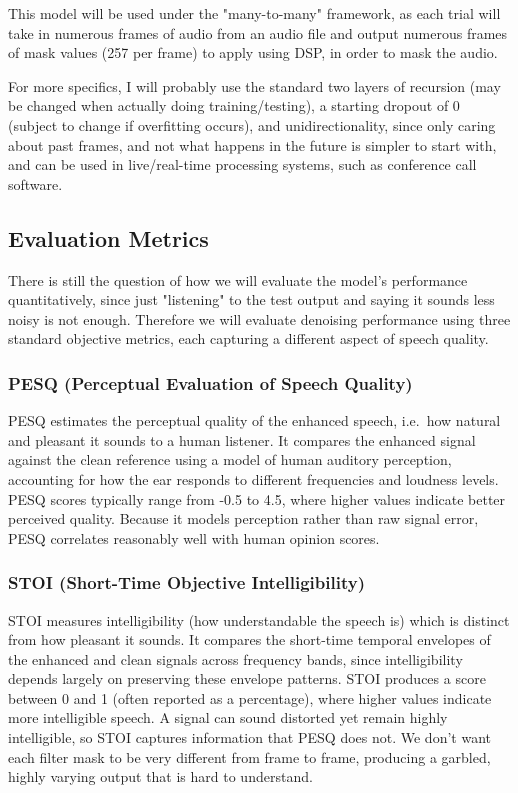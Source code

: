 \documentclass[11pt, letterpaper]{article}
\begin{document}
This model will be used under the "many-to-many" framework, as each trial will take in numerous frames of audio from an audio file and output numerous frames of mask values (257 per frame) to apply using DSP, in order to mask the audio.

For more specifics, I will probably use the standard two layers of recursion (may be changed when actually doing training/testing), a starting dropout of 0 (subject to change if overfitting occurs), and unidirectionality, since only caring about past frames, and not what happens in the future is simpler to start with, and can be used in live/real-time processing systems, such as conference call software. 

\subsection{Evaluation Metrics}

There is still the question of how we will evaluate the model's performance quantitatively, since just "listening" to the test output and saying it sounds less noisy is not enough. Therefore we will evaluate denoising performance using three standard objective metrics, each capturing a different aspect of speech quality.

\subsubsection{PESQ (Perceptual Evaluation of Speech Quality)}
PESQ estimates the perceptual quality of the enhanced speech,
i.e.\ how natural and pleasant it sounds to a human listener. It
compares the enhanced signal against the clean reference using a model
of human auditory perception, accounting for how the ear responds to
different frequencies and loudness levels. PESQ scores typically range
from -0.5 to 4.5, where higher values indicate better perceived
quality. Because it models perception rather than raw signal error,
PESQ correlates reasonably well with human opinion scores.

\subsubsection{STOI (Short-Time Objective Intelligibility)}
STOI measures intelligibility (how understandable the speech
is) which is distinct from how pleasant it sounds. It compares the
short-time temporal envelopes of the enhanced and clean signals across
frequency bands, since intelligibility depends largely on preserving
these envelope patterns. STOI produces a score between 0 and 1
(often reported as a percentage), where higher values indicate more
intelligible speech. A signal can sound distorted yet remain highly
intelligible, so STOI captures information that PESQ does not. We don't want each filter mask to be very different from frame to frame, producing a garbled, highly varying output that is hard to understand.
\end{document}
